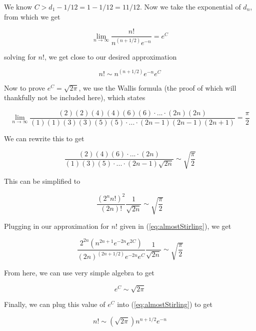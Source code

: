 \documentclass[11pt]{article}
\begin{document}
We know $C > d_{1} - 1/12 = 1 - 1/12 = 11/12$. Now we take the exponential of $d_{n}$, from which we get

\begin{equation}
\lim_{n \to \infty} \frac{n!}{n^{(n + 1/2)}e^{-n}} = e^{C}
\end{equation}

\noindent solving for $n!$, we get close to our desired approximation

\begin{equation}
n! \sim n^{(n + 1/2)}e^{-n} e^{C}
\label{eq:almostStirling}
\end{equation}


Now to prove $e^{C} = \sqrt{2\pi}$, we use the Wallis formula (the proof of which will thankfully not be included here), which states 

\begin{equation}
\lim_{n \to \infty} \frac{(2)(2)(4)(4)(6)(6)\cdot ... \cdot(2n)(2n)}{(1)(1)(3)(3)(5)(5)\cdot ... \cdot(2n-1)(2n-1)(2n+1)} = \frac{\pi}{2}
\end{equation}

\noindent We can rewrite this to get

\begin{equation}
\frac{(2)(4)(6)\cdot ... \cdot(2n)}{(1)(3)(5)\cdot ... \cdot(2n-1)\sqrt{2n}} \sim \sqrt{\frac{\pi}{2}}
\end{equation}

\noindent This can be simplified to

\begin{equation}
\frac{(2^{n}n!)^{2}}{(2n)!}  \frac{1}{\sqrt{2n}} \sim \sqrt{\frac{\pi}{2}}
\end{equation}

\noindent Plugging in our approximation for $n!$ given in (\ref{eq:almostStirling}), we get

\begin{equation}
\frac{2^{2n}(n^{2n+1}e^{-2n}e^{2C})}{(2n)^{(2n+1/2)}e^{-2n}e^{C}} \frac{1}{\sqrt{2n}} \sim \sqrt{\frac{\pi}{2}}
\end{equation}

\noindent From here, we can use very simple algebra to get

\begin{equation}
e^{C} \sim \sqrt{2\pi}
\end{equation}

\noindent Finally, we can plug this value of $e^{C}$ into (\ref{eq:almostStirling}) to get

\begin{equation}
n! \sim (\sqrt{2\pi})n^{n+1/2}e^{-n}
\label{eq:stirling}
\end{equation}
\end{document}

